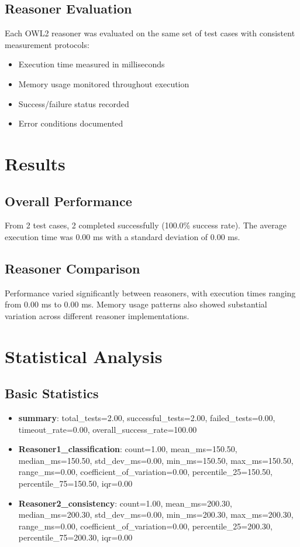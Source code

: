 \documentclass[11pt,a4paper]{{article}}
\begin{document}
\subsection{Reasoner Evaluation}
Each OWL2 reasoner was evaluated on the same set of test cases with consistent measurement protocols:
\begin{itemize}
    \item Execution time measured in milliseconds
    \item Memory usage monitored throughout execution
    \item Success/failure status recorded
    \item Error conditions documented
\end{itemize}


\section{Results}

\subsection{Overall Performance}
From 2 test cases, 2 completed successfully (100.0\% success rate). The average execution time was 0.00 ms with a standard deviation of 0.00 ms.

\subsection{Reasoner Comparison}
Performance varied significantly between reasoners, with execution times ranging from 0.00 ms to 0.00 ms. Memory usage patterns also showed substantial variation across different reasoner implementations.


\section{Statistical Analysis}

\subsection{Basic Statistics}
\begin{itemize}
    \item \textbf{summary}: total_tests=2.00, successful_tests=2.00, failed_tests=0.00, timeout_rate=0.00, overall_success_rate=100.00
    \item \textbf{Reasoner1_classification}: count=1.00, mean_ms=150.50, median_ms=150.50, std_dev_ms=0.00, min_ms=150.50, max_ms=150.50, range_ms=0.00, coefficient_of_variation=0.00, percentile_25=150.50, percentile_75=150.50, iqr=0.00
    \item \textbf{Reasoner2_consistency}: count=1.00, mean_ms=200.30, median_ms=200.30, std_dev_ms=0.00, min_ms=200.30, max_ms=200.30, range_ms=0.00, coefficient_of_variation=0.00, percentile_25=200.30, percentile_75=200.30, iqr=0.00
\end{itemize}
\end{document}
